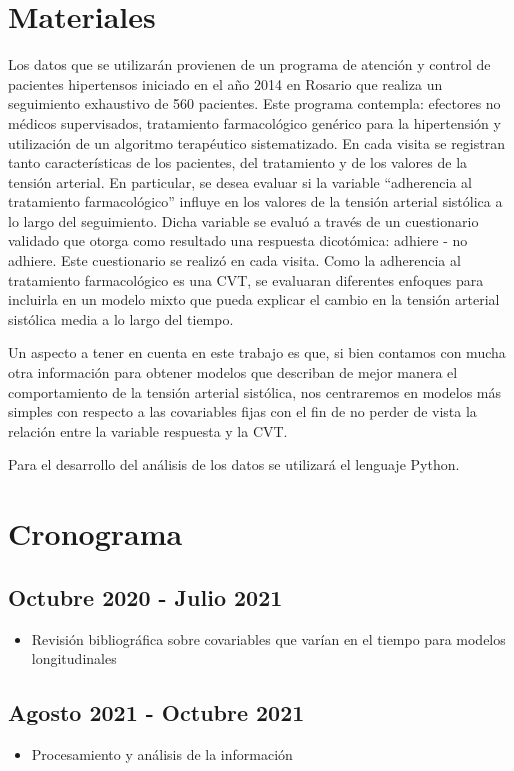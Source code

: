 \documentclass[12pt]{article}
\def\npatients{560}
\begin{document}
\newpage
\section{Materiales}

Los datos que se utilizarán provienen de un programa de atención y control de pacientes hipertensos iniciado en el año 2014
en Rosario que realiza un seguimiento exhaustivo de \npatients{} pacientes. Este programa contempla: efectores no médicos
supervisados, tratamiento farmacológico genérico para la hipertensión y utilización de un algoritmo terapéutico sistematizado.
En cada visita se registran tanto características de los pacientes, del tratamiento y de los valores de la tensión arterial.
En particular, se desea evaluar si la variable ``adherencia al tratamiento farmacológico'' influye en los valores de la tensión arterial
sistólica a lo largo del seguimiento. Dicha variable se evaluó a través de un cuestionario validado que otorga como resultado
una respuesta dicotómica: adhiere - no adhiere. Este cuestionario se realizó en cada visita. Como la adherencia al tratamiento
farmacológico es una CVT, se evaluaran diferentes enfoques para incluirla en un modelo mixto que pueda explicar el cambio
en la tensión arterial sistólica media a lo largo del tiempo.

Un aspecto a tener en cuenta en este trabajo es que, si bien contamos con mucha otra información para obtener modelos
que describan de mejor manera el comportamiento de la tensión arterial sistólica, nos centraremos en modelos más simples con
respecto a las covariables fijas con el fin de no perder de vista la relación entre la variable respuesta y la CVT.

Para el desarrollo del análisis de los datos se utilizará el lenguaje Python.

\newpage
\section{Cronograma}

\subsection*{Octubre 2020 - Julio 2021}
\begin{itemize}
	\item Revisión bibliográfica sobre covariables que varían en el tiempo para modelos longitudinales
\end{itemize}

\subsection*{Agosto 2021 - Octubre 2021}
\begin{itemize}
	\item Procesamiento y análisis de la información 
\end{itemize}
\end{document}
